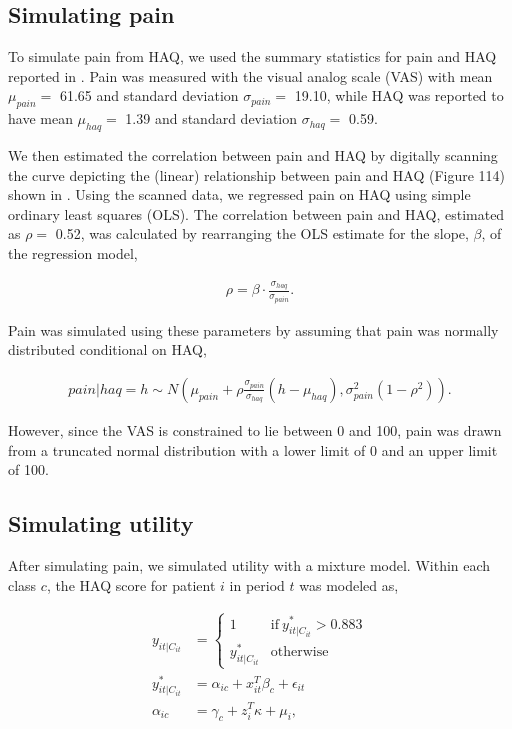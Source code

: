\documentclass[11pt,final,fleqn]{article}\usepackage[]{graphicx}\usepackage[]{color}
\theoremstyle{plain}
\begin{document}
\begin{appendices}
\subsection{Simulating pain}
To simulate pain from HAQ, we used the summary statistics for pain and HAQ reported in \citet{sarzi2002correlation}. Pain was measured with the visual analog scale (VAS) with mean  $\mu_{pain} =$ 61.65 and standard deviation $\sigma_{pain} =$ 19.10, while HAQ was reported to have mean $\mu_{haq} =$ 1.39 and standard deviation $\sigma_{haq} =$ 0.59. 

We then estimated the correlation between pain and HAQ by digitally scanning the curve depicting the (linear) relationship between pain and HAQ (Figure 114) shown in \citet{stevenson2016adalimumab}. Using the scanned data, we regressed pain on HAQ using simple ordinary least squares (OLS). The correlation between pain and HAQ, estimated as $\rho =$ 0.52, was calculated by rearranging the OLS estimate for the slope, $\beta$, of the regression model,

\begin{align}
\rho = \beta \cdot \frac{\sigma_{haq}}{\sigma_{pain}}.
\end{align}

Pain was simulated using these parameters by assuming that pain was normally distributed conditional on HAQ,

\begin{align}
pain | haq = h \sim N\left (\mu_{pain} + \rho \frac{\sigma_{pain}}{\sigma_{haq}}(h - \mu_{haq}), \sigma^2_{pain}(1 - \rho^2)\right).
\end{align}

However, since the VAS is constrained to lie between 0 and 100, pain was drawn from a truncated normal distribution with a lower limit of 0 and an upper limit of 100. 


\subsection{Simulating utility}
After simulating pain, we simulated utility with a mixture model. Within each class $c$, the HAQ score for patient $i$ in period $t$ was modeled as,

\begin{align}
y_{it|C_{it}} &= 
\begin{cases}
  1 & \text{if}\  y^{*}_{it|C_{it}}>0.883 \\
  y^{*}_{it|C_{it}} & \text{otherwise}
\end{cases}\\
y^{*}_{it|C_{it}} &= \alpha_{ic} +  x_{it}^T\beta_{c} + \epsilon_{it}\\
\alpha_{ic} &=  \gamma_{c} + z_{i}^T\kappa + \mu_{i},
\end{align}


\end{appendices}
\end{document}
